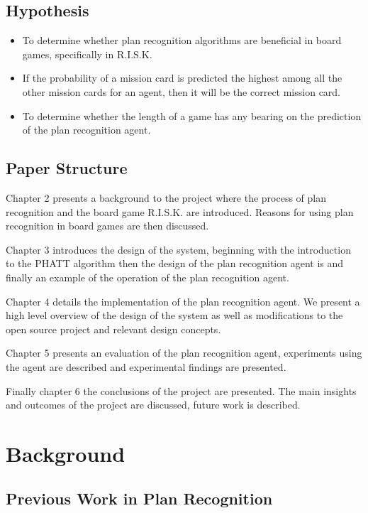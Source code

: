 \documentclass[parskip]{cs4rep}
\begin{document}
\section{Hypothesis}

\begin{itemize}
\item
To determine whether plan recognition algorithms are beneficial in board games, specifically in R.I.S.K.
\item
If the probability of a mission card is predicted the highest among all the other mission cards for an agent, then it will be the correct mission card.
\item
To determine whether the length of a game has any bearing on the prediction of the plan recognition agent.
\end{itemize}

\section{Paper Structure}

Chapter 2 presents a background to the project where the process of plan recognition and the board game R.I.S.K. are introduced. Reasons for using plan recognition in board games are then discussed.

Chapter 3 introduces the design of the system, beginning with the introduction to the PHATT algorithm then the design of the plan recognition agent is and finally an example of the operation of the plan recognition agent. 

Chapter 4 details the implementation of the plan recognition agent. We present a high level overview of the design of the system as well as modifications to the open source project and relevant design concepts. 

Chapter 5 presents an evaluation of the plan recognition agent, experiments using the agent are described and experimental findings are presented.

Finally chapter 6 the conclusions of the project are presented. The main insights and outcomes of the project are discussed, future work is described.

\chapter{Background}

\section{Previous Work in Plan Recognition}
\end{document}
